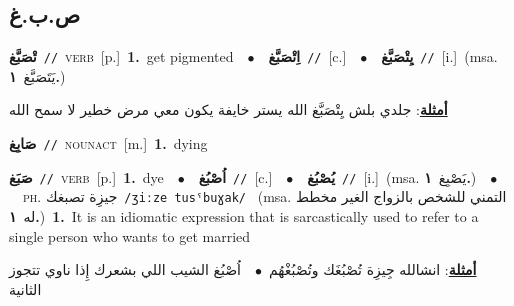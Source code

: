 \documentclass[10pt,a4paper,twoside]{article} %
\begin{document}
\begin{multicols}{2}
\vspace{-3mm}
\subsection*{\color{blue}\foreignlanguage{arabic}{ص.ب.غ}\color{blue}{}} 

{\setlength\topsep{0pt}\textbf{\foreignlanguage{arabic}{تْصَبَّغ}}\ {\color{gray}\texttt{//}\color{black}}\ \textsc{verb}\ [p.]\ \textbf{1.}~get pigmented\ \ $\bullet$\ \ \setlength\topsep{0pt}\textbf{\foreignlanguage{arabic}{اِتْصَبَّغ}}\ {\color{gray}\texttt{//}\color{black}}\ [c.]\ \ $\bullet$\ \ \setlength\topsep{0pt}\textbf{\foreignlanguage{arabic}{يِتْصَبَّغ}}\ {\color{gray}\texttt{//}\color{black}}\ [i.]\ \color{gray}(msa. \foreignlanguage{arabic}{يَتَصَبَّغ}~\foreignlanguage{arabic}{\textbf{١.}})\color{black}\  \begin{flushright}\color{gray}\foreignlanguage{arabic}{\textbf{\underline{\foreignlanguage{arabic}{أمثلة}}}: جلدي بلش يِتْصَبَّغ الله يستر خايفة يكون معي مرض خطير لا سمح الله}\end{flushright}\color{black}} \vspace{2mm}

{\setlength\topsep{0pt}\textbf{\foreignlanguage{arabic}{صَابِغ}}\ {\color{gray}\texttt{//}\color{black}}\ \textsc{noun\textunderscore act}\ [m.]\ \textbf{1.}~dying\ } \vspace{2mm}

{\setlength\topsep{0pt}\textbf{\foreignlanguage{arabic}{صَبَغ}}\ {\color{gray}\texttt{//}\color{black}}\ \textsc{verb}\ [p.]\ \textbf{1.}~dye\ \ $\bullet$\ \ \setlength\topsep{0pt}\textbf{\foreignlanguage{arabic}{اُصْبُغ}}\ {\color{gray}\texttt{//}\color{black}}\ [c.]\ \ $\bullet$\ \ \setlength\topsep{0pt}\textbf{\foreignlanguage{arabic}{يُصْبُغ}}\ {\color{gray}\texttt{//}\color{black}}\ [i.]\ \color{gray}(msa. \foreignlanguage{arabic}{يَصْبِغ}~\foreignlanguage{arabic}{\textbf{١.}})\color{black}\ \ $\bullet$\ \ \textsc{ph.} \color{gray} \foreignlanguage{arabic}{جيزِة تصبغك}\color{black}\ {\color{gray}\texttt{/{\sffamily ʒiːze tusˤbuɣak}/}\color{black}}\ \color{gray} (msa. \foreignlanguage{arabic}{التمني للشخص بالزواج الغير مخطط له}~\foreignlanguage{arabic}{\textbf{١.}})\color{black}\ \textbf{1.}~It is an idiomatic expression that is sarcastically used to refer to a single person who wants to get married\  \begin{flushright}\color{gray}\foreignlanguage{arabic}{\textbf{\underline{\foreignlanguage{arabic}{أمثلة}}}: انشالله جِيزِة تُصْبُغَك وتُصْبُغْهُم\ $\bullet$\ \  اُصْبُغ الشيب اللي بشعرك إِذا ناوي تتجوز الثانية}\end{flushright}\color{black}} \vspace{2mm}


\end{multicols}
\end{document}
